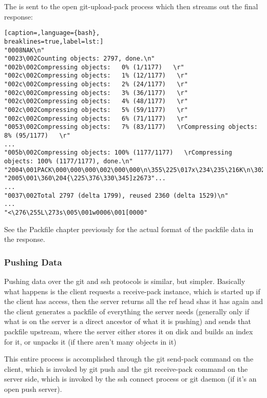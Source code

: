 The is sent to the open git-upload-pack process which then streams out the
final response:
\lstset{basicstyle=\scriptsize, numbers=none, captionpos=b, tabsize=4}
\begin{lstlisting}[caption=,language={bash},
breaklines=true,label=lst:]
"0008NAK\n"
"0023\002Counting objects: 2797, done.\n"
"002b\002Compressing objects:   0% (1/1177)   \r"
"002c\002Compressing objects:   1% (12/1177)   \r"
"002c\002Compressing objects:   2% (24/1177)   \r"
"002c\002Compressing objects:   3% (36/1177)   \r"
"002c\002Compressing objects:   4% (48/1177)   \r"
"002c\002Compressing objects:   5% (59/1177)   \r"
"002c\002Compressing objects:   6% (71/1177)   \r"
"0053\002Compressing objects:   7% (83/1177)   \rCompressing objects:   8% (95/1177)   \r"
...
"005b\002Compressing objects: 100% (1177/1177)   \rCompressing objects: 100% (1177/1177), done.\n"
"2004\001PACK\000\000\000\002\000\000\n\355\225\017x\234\235\216K\n\302"...
"2005\001\360\204{\225\376\330\345]z2673"...
...
"0037\002Total 2797 (delta 1799), reused 2360 (delta 1529)\n"
...
"<\276\255L\273s\005\001w0006\001[0000"
\end{lstlisting}

See the Packfile chapter previously for the actual format of the packfile data
in the response.

\subsubsection{Pushing Data}
Pushing data over the git and ssh protocols is similar, but simpler. Basically
what happens is the client requests a receive-pack instance, which is started
up if the client has access, then the server returns all the ref head shas it
has again and the client generates a packfile of everything the server needs
(generally only if what is on the server is a direct ancestor of what it is
pushing) and sends that packfile upstream, where the server either stores it on
disk and builds an index for it, or unpacks it (if there aren't many objects in
it)

This entire process is accomplished through the git send-pack command on the
client, which is invoked by git push and the git receive-pack command on the
server side, which is invoked by the ssh connect process or git daemon (if it's
an open push server).

